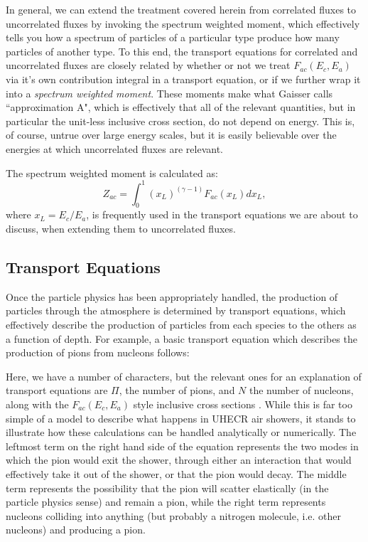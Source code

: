 In general, we can extend the treatment covered herein from correlated fluxes to uncorrelated fluxes by invoking the spectrum weighted moment, which effectively tells you how a spectrum of particles of a particular type produce how many particles of another type. To this end, the transport equations for correlated and uncorrelated fluxes are closely related by whether or not we treat $F_{ac}(E_c,E_a)$ via it's own contribution integral in a transport equation, or if we further wrap it into a \textit{spectrum weighted moment}. These moments make what Gaisser calls ``approximation A", which is effectively that all of the relevant quantities, but in particular the unit-less inclusive cross section, do not depend on energy. This is, of course, untrue over large energy scales, but it is easily believable over the energies at which uncorrelated fluxes are relevant.

The spectrum weighted moment is calculated as:
$$ Z_{ac}=\int_0^1 (x_L)^{(\gamma-1)}F_{ac}(x_L) dx_L ,$$
where $x_L=E_c/E_a$, is frequently used in the transport equations we are about to discuss, when extending them to uncorrelated fluxes.

\subsection{Transport Equations}
Once the particle physics has been appropriately handled, the production of particles through the atmosphere is determined by transport equations, which effectively describe the production of particles from each species to the others as a function of depth. For example, a basic transport equation which describes the production of pions from nucleons follows:



Here, we have a number of characters, but the relevant ones for an explanation of transport equations are $\Pi$, the number of pions, and $N$ the number of nucleons, along with the $F_{ac}(E_c,E_a)$ style inclusive cross sections \cite{crapp}. While this is far too simple of a model to describe what happens in UHECR air showers, it stands to illustrate how these calculations can be handled analytically or numerically. The leftmost term on the right hand side of the equation represents the two modes in which the pion would exit the shower, through either an interaction that would effectively take it out of the shower, or that the pion would decay. The middle term represents the possibility that the pion will scatter elastically (in the particle physics sense) and remain a pion, while the right term represents nucleons colliding into anything (but probably a nitrogen molecule, i.e. other nucleons) and producing a pion. 

